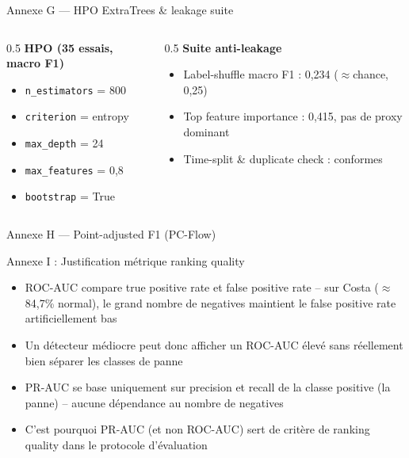 \documentclass[10pt,aspectratio=169]{beamer}
\begin{document}
\begin{frame}{Annexe G --- HPO ExtraTrees \& leakage suite}
  \footnotesize
  \begin{columns}[T]
    \begin{column}{0.5\textwidth}
      \textbf{HPO (35 essais, macro F1)}
      \begin{itemize}
        \item \texttt{n\_estimators} = 800
        \item \texttt{criterion} = entropy
        \item \texttt{max\_depth} = 24
        \item \texttt{max\_features} = 0,8
        \item \texttt{bootstrap} = True
      \end{itemize}
    \end{column}
    \begin{column}{0.5\textwidth}
      \textbf{Suite anti-leakage}
      \begin{itemize}
        \item Label-shuffle macro F1 : 0,234 ($\approx$chance, 0,25)
        \item Top feature importance : 0,415, pas de proxy dominant
        \item Time-split \& duplicate check : conformes
      \end{itemize}
    \end{column}
  \end{columns}
\end{frame}

\begin{frame}{Annexe H --- Point-adjusted F1 (PC-Flow)}
\end{frame}

\begin{frame}{Annexe I : Justification métrique ranking quality}
  \footnotesize
  \begin{itemize}
    \item ROC-AUC compare true positive rate et false positive rate -- sur Costa ($\approx$84,7\% normal), le grand nombre de negatives maintient le false positive rate artificiellement bas
    \item Un détecteur médiocre peut donc afficher un ROC-AUC élevé sans réellement bien séparer les classes de panne
    \item PR-AUC se base uniquement sur precision et recall de la classe positive (la panne) -- aucune dépendance au nombre de negatives
    \item C'est pourquoi PR-AUC (et non ROC-AUC) sert de critère de ranking quality dans le protocole d'évaluation
  \end{itemize}
\end{frame}
\end{document}
